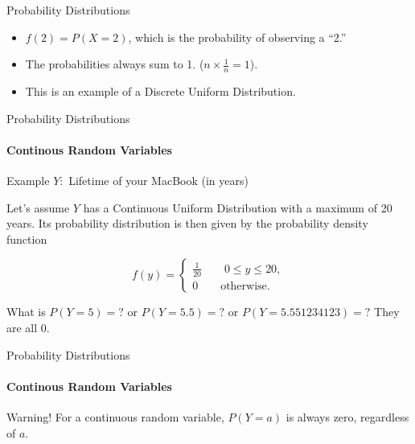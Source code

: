 \documentclass{beamer}\usepackage[]{graphicx}\usepackage[]{color}
\begin{document}
\begin{darkframes}
\begin{frame}[label=lists]{Probability Distributions}
       
        \begin{itemize}
        	\item $f(2)=P(X=2)$, which is the probability of observing a ``2.'' \pause
        	
        	\item The probabilities always sum to 1. ($n \times \frac{1}{n} = 1$).  \pause
    		
      		\item This is an example of a \alert{Discrete Uniform Distribution}.    	
	        	
        \end{itemize} 
	\end{frame}







	\begin{frame}[label=lists]{Probability Distributions}
		\framesubtitle{Continous Random Variables} 
	
		\begin{exampleblock}{Example}
		$Y:$ Lifetime of your MacBook (in years) \pause
		
		Let's assume $Y$ has a \alert{Continuous Uniform Distribution} with a maximum of 20 years. Its probability distribution is then given by the probability density function \pause
		
		$$ f(y) = 
			\begin{cases}
				\frac{1}{20} \qquad 0 \leq y \leq 20, \\
				0 \qquad   \text{otherwise.}
			\end{cases}
		$$  \pause
		
		What is $P(Y=5)=?$ or $P(Y=5.5)=?$ or $P(Y=5.551234123)=?$ \newline  \pause
		They are all 0.
		
		
		\end{exampleblock}
			
	\end{frame}





	\begin{frame}[label=lists]{Probability Distributions}
		\framesubtitle{Continous Random Variables} 
	
		\begin{alertblock}{Warning!}
        For a continuous random variable, $P(Y=a)$ is always zero, regardless of $a$. \newline 
      \end{alertblock}  \pause
      

\end{frame}
\end{darkframes}
\end{document}
